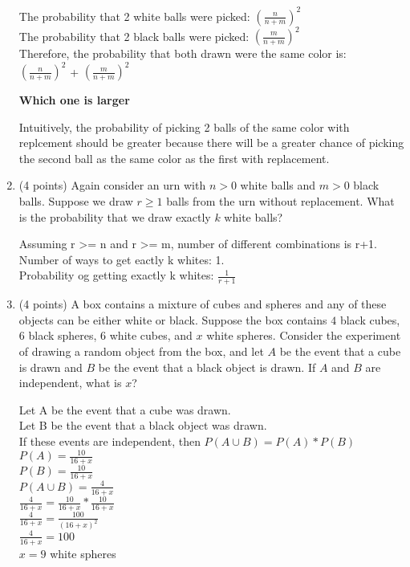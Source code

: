 \documentclass[11pt]{article}
\begin{document}
\begin{enumerate}
	The probability that 2 white balls were picked: $(\frac{n}{n+m})^{2}$ \\
	The probability that 2 black balls were picked: $(\frac{m}{n+m})^{2}$ \\
	Therefore, the probability that both drawn were the same color is: \\
	$(\frac{n}{n+m})^{2}$ + $(\frac{m}{n+m})^{2}$ 

{\bf Which one is larger}

	Intuitively, the probability of picking 2 balls of the same color with
	replcement should be greater because there will be a greater chance of 
	picking the second ball as the same color as the first with replacement.

\item (4 points) Again consider an urn with $n>0$ white balls and $m >0$ black
balls.  Suppose we draw $r\geq 1$ balls from the urn without replacement.  What
is the probability that we draw exactly $k$ white balls?

Assuming r >= n and r >= m, number of different combinations is r+1. \\
Number of ways to get eactly k whites: 1. \\
Probability og getting exactly k whites: $\frac{1}{r+1}$

\item (4 points) A box contains a mixture of cubes and spheres and any of these
objects can be either white or black.  Suppose the box contains $4$ black
cubes, $6$ black spheres, $6$ white cubes, and $x$ white spheres.  Consider the
experiment of drawing a random object from the box, and let $A$ be the event
that a cube is drawn and $B$ be the event that a black object is drawn.
If $A$ and $B$ are independent, what is $x$?

	Let A be the event that a cube was drawn. \\
	Let B be the event that a black object was drawn. \\
	If these events are independent, then $P(A \cup B) = P(A) * P(B)$ \\
	$P(A) = \frac{10}{16+x}$ \\
	$P(B) = \frac{10}{16+x}$ \\
	$P(A \cup B) = \frac{4}{16+x}$ \\
	$\frac{4}{16+x} = \frac{10}{16+x} * \frac{10}{16+x}$ \\
	$\frac{4}{16+x} = \frac{100}{(16+x)^{2}}$ \\
	$\frac{4}{16+x} = 100$ \\
	$x = 9$ white spheres



\end{enumerate}
\end{document}
